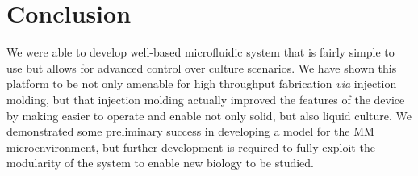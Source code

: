 \section{Conclusion}
We were able to develop well-based microfluidic system that is fairly simple to use but allows for advanced control over culture scenarios. We have shown this platform to be not only amenable for high throughput fabrication \textit{via} injection molding, but that injection molding actually improved the features of the device by making easier to operate and enable not only solid, but also liquid culture. We demonstrated some preliminary success in developing a model for the MM microenvironment, but further development is required to fully exploit the modularity of the system to enable new biology to be studied. 
